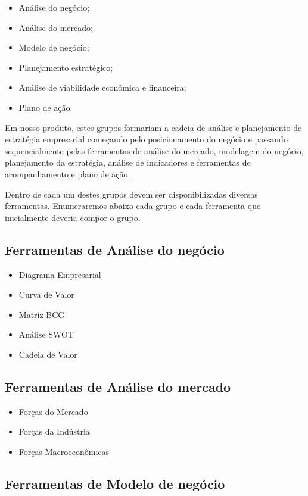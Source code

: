 \documentclass{abnt}
\begin{document}
\begin{itemize}
	\item Análise do negócio;
	\item Análise do mercado;
	\item Modelo de negócio;
	\item Planejamento estratégico;
	\item Análise de viabilidade econômica e financeira;
	\item Plano de ação.
\end{itemize}

Em nosso produto, estes grupos formariam a cadeia de análise e planejamento de
estratégia empresarial começando pelo posicionamento do negócio e passando
sequencialmente pelas ferramentas de análise do mercado, modelagem do negócio,
planejamento da estratégia, análise de indicadores e ferramentas de
acompanhamento e plano de ação.

Dentro de cada um destes grupos devem ser disponibilizadas diversas ferramentas.
Enumeraremos abaixo cada grupo e cada ferramenta que inicialmente deveria compor
o grupo.

\subsection{Ferramentas de Análise do negócio}

\begin{itemize}
	\item Diagrama Empresarial
	\item Curva de Valor
	\item Matriz BCG
	\item Análise SWOT
	\item Cadeia de Valor
\end{itemize}

\subsection{Ferramentas de Análise do mercado}

\begin{itemize}
	\item Forças do Mercado
	\item Forças da Indústria
	\item Forças Macroeconômicas
\end{itemize}

\subsection{Ferramentas de Modelo de negócio}
\end{document}
